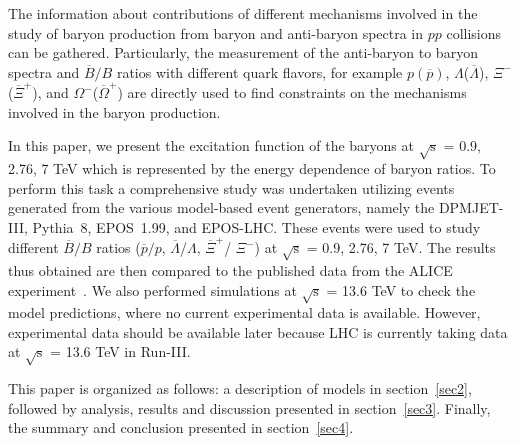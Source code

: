 \documentclass{article}
\newcommand{\sqrts}{\mbox{$\sqrt{\mathrm{s}}$}}
\newcommand{\axi}{$\overline{\Xi}^+$}
\newcommand{\xim}{$\Xi^-$}
\newcommand{\alam}{$\overline{\Lambda}$}
\newcommand{\lam}{$\Lambda$}
\newcommand{\omm}{$\Omega^-$}
\newcommand{\aom}{$\overline{\Omega}^+$}
\begin{document}
The information about contributions of different mechanisms involved in the study of baryon production from baryon and anti-baryon spectra in $pp$ collisions can be gathered. Particularly, the measurement of the anti-baryon to baryon spectra and $\overline{B}/B$ ratios with different quark flavors, for example $p (\overline{p})$, {\lam (\alam)}, {\xim(\axi)}, and {\omm (\aom)} are directly used to find constraints on the mechanisms involved in the baryon production. %


In this paper, we present the excitation function of the baryons at {\sqrts} = 0.9, 2.76, 7 TeV which is represented by the energy dependence of baryon ratios. To perform this task a comprehensive study was undertaken utilizing events generated from the various model-based event generators, namely the DPMJET-III, Pythia~8, EPOS~1.99, and EPOS-LHC. These events were used to study different $\overline{B}/B$ ratios ($\overline{p}/p$, {\alam /\lam}, {\axi / \xim}) at {\sqrts} = 0.9, 2.76, 7 TeV. The results thus obtained are then compared to the published data from the ALICE experiment~\cite{20}. We also performed simulations at {\sqrts} = 13.6 TeV to check the model predictions, where no current experimental data is available. However, experimental data should be available later because LHC is currently taking data at {\sqrts} = 13.6 TeV in Run-III. 

This paper is organized as follows: a description of models in section~\ref{sec2}, followed by analysis, results and discussion presented in section~\ref{sec3}. Finally, the summary and conclusion presented in section~\ref{sec4}. 
\end{document}
